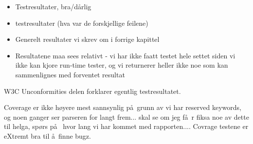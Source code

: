 \begin{itemize}
\item Testresultater, bra/d\aa rlig
\item testresultater (hva var de forskjellige feilene)
\item Generelt resultater vi skrev om i forrige kapittel
\item Resultatene maa sees relativt - vi har ikke faatt testet hele settet siden
vi ikke kan kjore run-time tester, og vi returnerer heller ikke noe som kan
sammenlignes med forventet resultat
\end{itemize}

W3C Unconformities delen forklarer egentlig testresultatet.

Coverage er ikke h\o yere mest sannsynlig p\aa~grunn av vi har reserved
keywords, og noen ganger ser parseren for langt frem... skal se om jeg f\aa~r
fiksa noe av dette til helga, sp\o rs p\aa~ hvor lang vi har kommet med
rapporten.... Covrage testene er eXtremt bra til \aa~finne bugz.